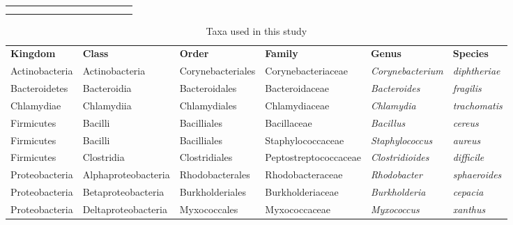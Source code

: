 \begin{table}
\begin{tabular}{p{.05cm}p{4cm}p{2.45cm}p{1.60cm}p{2.12cm}p{1.85cm}p{.4cm}>{\hfill}p{.4cm}p{.15cm}p{.1cm}>{\hfill}p{.27cm}p{.15cm}p{.1cm}}
    \bottomrule

    \begin{minipage}[t]{.5\textwidth}
      {\tiny
        $\checkmark$  correct assembly; --  unnassembled; $\times$  incorrect assembly\\
      }
    \end{minipage}
  \end{tabular}%


\end{table}



\begin{table}[]
\centering
\caption{Taxa used in this study}
\label{table:allphyla}
\begin{tabular}{llllll}
\textbf{Kingdom} & \textbf{Class}        & \textbf{Order}     & \textbf{Family}       & \textbf{Genus}            & \textbf{Species}     \\
Actinobacteria   & Actinobacteria        & Corynebacteriales  & Corynebacteriaceae    & \textit{Corynebacterium}  & \textit{diphtheriae} \\
Bacteroidetes    & Bacteroidia           & Bacteroidales      & Bacteroidaceae        & \textit{Bacteroides}      & \textit{fragilis}    \\
Chlamydiae       & Chlamydiia            & Chlamydiales       & Chlamydiaceae         & \textit{Chlamydia}        & \textit{trachomatis} \\
Firmicutes       & Bacilli               & Bacilliales        & Bacillaceae           & \textit{Bacillus}         & \textit{cereus}      \\
Firmicutes       & Bacilli               & Bacilliales        & Staphylococcaceae     & \textit{Staphylococcus}   & \textit{aureus}      \\
Firmicutes       & Clostridia            & Clostridiales      & Peptostreptococcaceae & \textit{Clostridioides}   & \textit{difficile}   \\
Proteobacteria   & Alphaproteobacteria   & Rhodobacterales    & Rhodobacteraceae      & \textit{Rhodobacter}      & \textit{sphaeroides} \\
Proteobacteria   & Betaproteobacteria    & Burkholderiales    & Burkholderiaceae      & \textit{Burkholderia}     & \textit{cepacia}     \\
Proteobacteria   & Deltaproteobacteria   & Myxococcales       & Myxococcaceae         & \textit{Myxococcus}       & \textit{xanthus}     \\

\end{tabular}
\end{table}

